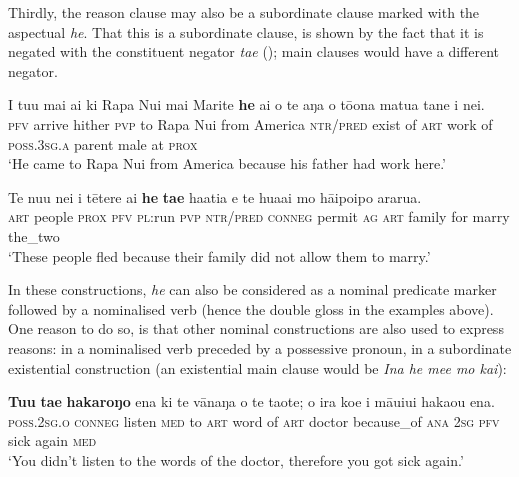 Thirdly, the reason clause may also be a subordinate clause marked with the aspectual \textit{he}. That this is a subordinate clause, is shown by the fact that it is negated with the constituent negator \textit{ta{\ꞌ}e} (); main clauses would have a different negator. 

\ea\label{ex:11.256}
\gll I tu{\ꞌ}u mai ai ki Rapa Nui mai Marite \textbf{he} ai o te aŋa  o tō{\ꞌ}ona matu{\ꞌ}a tane {\ꞌ}i nei.\\
\textsc{pfv} arrive hither \textsc{pvp} to Rapa Nui from America \textsc{ntr}/\textsc{pred} exist of \textsc{art} work  of \textsc{poss.3sg.a} parent male at \textsc{prox}\\

\glt 
‘He came to Rapa Nui from America because his father had work here.’ \textstyleExampleref{[R461.002]} 
\z

\ea\label{ex:11.257}
\gll Te nu{\ꞌ}u nei i tētere ai \textbf{he} \textbf{ta{\ꞌ}e} ha{\ꞌ}ati{\ꞌ}a e te hua{\ꞌ}ai  mo hāipoipo ararua.\\
\textsc{art} people \textsc{prox} \textsc{pfv} \textsc{pl}:run \textsc{pvp} \textsc{ntr}/\textsc{pred} \textsc{conneg} permit \textsc{ag} \textsc{art} family  for marry the\_two\\

\glt
‘These people fled because their family did not allow them to marry.’ \textstyleExampleref{[R303.144]} 
\z

In these constructions, \textit{he} can also be considered as a nominal predicate marker followed by a nominalised verb (hence the double gloss in the examples above). One reason to do so, is that other nominal constructions are also used to express reasons: in  a nominalised verb preceded by a possessive pronoun, in  a subordinate existential construction (an existential main clause would be \textit{{\ꞌ}Ina he me{\ꞌ}e mo kai}):

\ea\label{ex:11.258}
\gll \textbf{Tu{\ꞌ}u} \textbf{ta{\ꞌ}e} \textbf{hakaroŋo} ena ki te vānaŋa o te taote; {\ꞌ}o ira  koe i māuiui haka{\ꞌ}ou ena.\\
\textsc{poss.2sg.o} \textsc{conneg} listen \textsc{med} to \textsc{art} word of \textsc{art} doctor because\_of \textsc{ana}  \textsc{2sg} \textsc{pfv} sick again \textsc{med}\\

\glt 
‘You didn’t listen to the words of the doctor, therefore you got sick again.’ \textstyleExampleref{[R237.087]} 
\z

